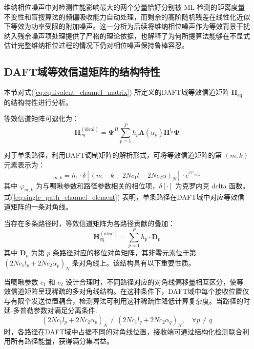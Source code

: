 维纳相位噪声中对检测性能影响最大的两个分量恰好分别被 ML 检测的距离度量不变性和盲搜算法的频偏吸收能力自动处理，而剩余的高阶随机残差在线性化近似下等效为功率受限的附加噪声。这一分析为后续将维纳相位噪声作为等效背景干扰纳入残余噪声项处理提供了严格的理论依据，也解释了为何所提算法能够在不显式估计完整维纳相位过程的情况下仍对相位噪声保持鲁棒容忍。

\subsection{DAFT域等效信道矩阵的结构特性}
\label{subsec:daft_channel_structure}

本节对式(\ref{eq:equivalent_channel_matrix}) 所定义的DAFT域等效信道矩阵 $\mathbf{H}_{\mathrm{eq}}$ 的结构特性进行分析。

等效信道矩阵可退化为：
\begin{equation}
    \mathbf{H}_{\mathrm{eq}}^{(\mathrm{ideal})} = \boldsymbol{\Psi}^{H} \sum_{p=1}^{P} h_p \boldsymbol{\Lambda}(\alpha_p) \boldsymbol{\Pi}^{l_p} \boldsymbol{\Psi}
    \label{eq:ideal_equiv_channel}
\end{equation}

对于单条路径，利用DAFT调制矩阵的解析形式，可将等效信道矩阵的第 $(m,k)$ 元素表示为：
\begin{equation}
    [\mathbf{H}_{\mathrm{eq}}^{(\mathrm{ideal})}]_{m,k} = h_1 \cdot \delta\!\left[(m - k - 2Nc_1 l - 2Nc_2\alpha)_N\right] \cdot e^{j\varphi_{m,k}}
    \label{eq:single_path_channel_element}
\end{equation}
其中 $\varphi_{m,k}$ 为与啁啾参数和路径参数相关的相位项，$\delta[\cdot]$ 为克罗内克 delta 函数。式(\ref{eq:single_path_channel_element}) 表明，单条路径在DAFT域中对应等效信道矩阵的一条对角线。

当存在多条路径时，等效信道矩阵为各路径贡献的叠加：
\begin{equation}
    \mathbf{H}_{\mathrm{eq}}^{(\mathrm{ideal})} = \sum_{p=1}^{P} h_p \cdot \mathbf{D}_p
    \label{eq:multipath_channel_superposition}
\end{equation}
其中 $\mathbf{D}_p$ 为第 $p$ 条路径对应的移位对角矩阵，其非零元素位于第 $(2Nc_1 l_p + 2Nc_2\alpha_p)_N$ 条对角线上。该结构具有以下重要性质。

当啁啾参数 $c_1$ 和 $c_2$ 设计合理时，不同路径对应的对角线偏移量相互区分，使等效信道矩阵呈现稀疏的多对角线结构。在这种条件下，DAFT域中每个接收位置仅与有限个发送位置耦合，检测算法可利用这种稀疏性降低计算复杂度。当路径的时延-多普勒参数对满足分离条件:
\begin{equation}
    (2Nc_1 l_p + 2Nc_2\alpha_p)_N \neq (2Nc_1 l_q + 2Nc_2\alpha_q)_N, \quad \forall p \neq q
    \label{eq:path_separation_condition_ch4}
\end{equation}
时，各路径在DAFT域中占据不同的对角线位置，接收端可通过结构化检测联合利用所有路径能量，获得满分集增益。

